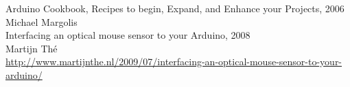 \documentclass[12pt]{article}
\begin{document}

\begin{thebibliography}{6}

Arduino Cookbook, Recipes to begin, Expand, and Enhance your Projects, 2006\\
Michael Margolis\\

Interfacing an optical mouse sensor to your Arduino, 2008\\
Martijn Th\'e\\
\scriptsize\url{http://www.martijnthe.nl/2009/07/interfacing-an-optical-mouse-sensor-to-your-arduino/}\\
 

\end{thebibliography}



\end{document}
